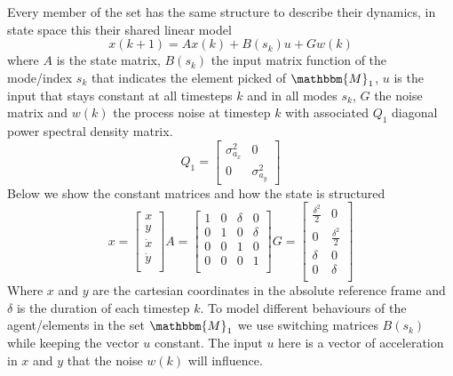 \documentclass[twocolumn]{article}
\begin{document}
    Every member of the set has the same structure 
    to describe their dynamics, in state space this their shared linear model
    \begin{equation}
        x(k+1)= Ax(k) + B(s_{k})u + Gw(k)
    \end{equation}
    where $A$ is the state matrix, $B(s_{k})$ the input matrix function of the mode/index $s_{k}$ that indicates the element picked of $\mathbbm{M}_{1}$, 
    $u$ is the input that stays constant at all timesteps $k$ and in all modes $s_{k}$, $G$ the noise matrix and $w(k)$ the process noise at timestep
     $k$ with associated $Q_{1}$ diagonal power spectral density matrix.
     \begin{equation*}
        Q_{1}=\begin{bmatrix}
            \sigma^{2}_{a_{x}}&0\\
            0&\sigma^{2}_{a_{y}}
        \end{bmatrix}
    \end{equation*}
     Below we show the constant matrices and how the state is structured
    \[ x=\begin{bmatrix} x \\ y \\ \dot{x} \\ \dot{y} \\ \end{bmatrix}  A=\begin{bmatrix}
        1 & 0 & \delta & 0      \\
        0 & 1 & 0      & \delta \\
        0 & 0 & 1      & 0      \\
        0 & 0 & 0      & 1      \\
    \end{bmatrix}
    G=\begin{bmatrix}
        \frac{\delta^{2}}{2} & 0          \\
        0          & \frac{\delta^{2}}{2} \\
        \delta     & 0          \\
        0          & \delta     \\
    \end{bmatrix}
\]
Where $x$ and $y$ are the cartesian coordinates in the absolute reference frame and $\delta$ is the duration of each timestep $k$.
To model different behaviours of the agent/elements in the set $\mathbbm{M}_{1}$ we use switching matrices $B(s_{k})$ while keeping the vector $u$ 
constant. The input $u$ here is a vector of acceleration in $x$ and $y$ that the noise $w(k)$ will influence.
\end{document}
